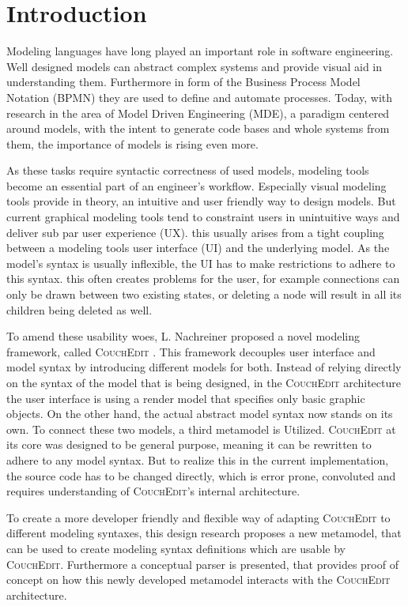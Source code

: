 \chapter{Introduction}
\label{chap:introduction}


Modeling languages have long played an important role in software engineering. Well designed models can abstract complex systems and provide visual aid in understanding them. Furthermore in form of the Business Process Model Notation (BPMN) they are used to define and automate processes. Today, with research in the area of Model Driven Engineering (MDE), a paradigm centered around models, with the intent to generate code bases and whole systems from them, the importance of models is rising even more.

As these tasks require syntactic correctness of used models, modeling tools become an essential part of an engineer's workflow. Especially visual modeling tools provide in theory, an intuitive and user friendly way to design models. But current graphical modeling tools tend to constraint users in unintuitive ways and deliver sub par user experience (UX). this usually arises from a tight coupling between a modeling tools user interface (UI) and the underlying model. As the model's syntax is usually inflexible, the UI has to make restrictions to adhere to this syntax. this often creates problems for the user, for example connections can only be drawn between two existing states, or deleting a node will result in all its children being deleted as well.

To amend these usability woes, L. Nachreiner proposed a novel modeling framework, called \textsc{CouchEdit} \cite{nachreiner_couchedit_2020}. This framework decouples user interface and model syntax by introducing different models for both. Instead of relying directly on the syntax of the model that is being designed, in the \textsc{CouchEdit} architecture the user interface is using a render model that specifies only basic graphic objects. On the other hand, the actual abstract model syntax now stands on its own. To connect these two models, a third metamodel is Utilized. \textsc{CouchEdit} at its core was designed to be general purpose, meaning it can be rewritten to adhere to any model syntax. But to realize this in the current implementation, the source code has to be changed directly, which is error prone, convoluted and requires understanding of \textsc{CouchEdit}'s internal architecture.

To create a more developer friendly and flexible way of adapting \textsc{CouchEdit} to different modeling syntaxes, this design research proposes a new metamodel, that can be used to create modeling syntax definitions which are usable by \textsc{CouchEdit}. Furthermore a conceptual parser is presented, that provides proof of concept on how this newly developed metamodel interacts with the \textsc{CouchEdit} architecture.


